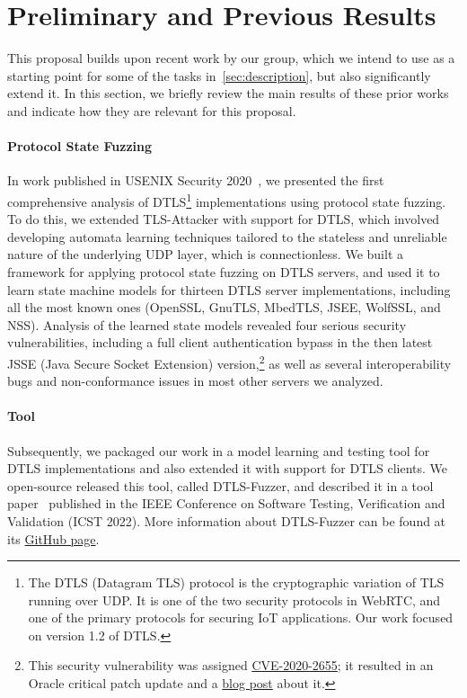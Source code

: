 \documentclass[11pt]{article}
\newcommand{\system}[1]{\mbox{\textsf{#1}}}
\newcommand{\myparagraph}{}
\let\myparagraph=\paragraph
\renewcommand{\paragraph}{\vspace{-3mm}\myparagraph}
\begin{document}
\section{Preliminary and Previous Results} \label{sec:prelim}
This proposal builds upon recent work by our group, which we intend to use as
a starting point for some of the tasks in~\cref{sec:description}, but also
significantly extend it.  In this section, we briefly review the main results
of these prior works and indicate how they are relevant for this proposal.

\paragraph{Protocol State Fuzzing}
In work published in USENIX Security 2020~\cite{DTLS@USENIX-20}, we presented
the first comprehensive analysis of DTLS\footnote{The DTLS (Datagram TLS)
protocol is the cryptographic variation of TLS running over UDP. It is one of
the two security protocols in WebRTC, and one of the primary protocols for
securing IoT applications. Our work focused on version 1.2 of DTLS.}
implementations using protocol state fuzzing. To do this, we extended
\system{TLS-Attacker} with support for DTLS, which involved developing
automata learning techniques tailored to the stateless and unreliable nature
of the underlying UDP layer, which is connectionless. We built a framework for
applying protocol state fuzzing on DTLS servers, and used it to learn state
machine models for thirteen DTLS server implementations, including all the
most known ones (OpenSSL, GnuTLS, MbedTLS, JSEE, WolfSSL, and NSS).
%
Analysis of the learned state models revealed four serious security
vulnerabilities, including a full client authentication bypass in the then
latest JSSE (Java Secure Socket Extension) version,\footnote{This security
vulnerability was assigned
\href{https://nvd.nist.gov/vuln/detail/CVE-2020-2655}{CVE-2020-2655}; it
resulted in an Oracle critical patch update and a
\href{https://web-in-security.blogspot.com/2020/01/cve-2020-2655-jsse-client.html}{blog
  post} about it.} as well as several interoperability bugs and
non-conformance issues in most other servers we analyzed.

\paragraph{Tool}
Subsequently, we packaged our work in a model learning and testing tool for
DTLS implementations and also extended it with support for DTLS clients. We
open-source released this tool, called \system{DTLS-Fuzzer}, and described it
in a tool paper~\cite{DTLS-Fuzzer@ICST-22} published in the IEEE Conference on
Software Testing, Verification and Validation (ICST 2022).
%
More information about \system{DTLS-Fuzzer} can be found at its
\href{https://github.com/assist-project/dtls-fuzzer/}{GitHub page}.
\end{document}
